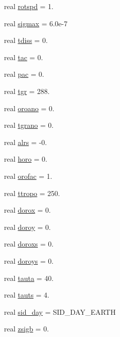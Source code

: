 \begin{DoxyCompactItemize}
\item 
real \hyperlink{classpumamod_a80df9669ec5bab4a057cae01f5c1a2e6}{rotspd} = 1.
\item 
real \hyperlink{classpumamod_abc4579c91fd4501ba251a05dd1bf516c}{sigmax} = 6.\-0e-\/7
\item 
real \hyperlink{classpumamod_a3c92fd62d271fb04326fc32013d8c199}{tdiss} = 0.
\item 
real \hyperlink{classpumamod_aa0e01ba5d349492b3449f389b5f93fed}{tac} = 0.
\item 
real \hyperlink{classpumamod_a7784d994e8d1702725dd2241891c1405}{pac} = 0.
\item 
real \hyperlink{classpumamod_a65df7e27542e483c7082758755d1f328}{tgr} = 288.
\item 
real \hyperlink{classpumamod_aa50284698e4f6c0677ad8674c812a287}{oroano} = 0.
\item 
real \hyperlink{classpumamod_aacd677d71f3a3b99afa150ea6e76ffd7}{tgrano} = 0.
\item 
real \hyperlink{classpumamod_acc7c9a43a2f8163077730a971e145878}{alrs} = -\/0.
\item 
real \hyperlink{classpumamod_aed84e71b62422066731030c119782c49}{horo} = 0.
\item 
real \hyperlink{classpumamod_abc7fb7a57043486f15c7aca03158fb2f}{orofac} = 1.
\item 
real \hyperlink{classpumamod_a5d1817a2b6703189d6ab73252b1996af}{ttropo} = 250.
\item 
real \hyperlink{classpumamod_aabd49cfc66d47dea3cf55589fc8ddabc}{dorox} = 0.
\item 
real \hyperlink{classpumamod_a2775f20201557322bc0de9c6967cc476}{doroy} = 0.
\item 
real \hyperlink{classpumamod_a848fc48f89796c7e1bfb0b1a6d2edb50}{doroxs} = 0.
\item 
real \hyperlink{classpumamod_ad8bf2c0adad70f111c86eb8924c1c52c}{doroys} = 0.
\item 
real \hyperlink{classpumamod_a2ff5f72c2ec1bb2f7a1931932165c297}{tauta} = 40.
\item 
real \hyperlink{classpumamod_a3e769cf019402107f3c6e96b8740cf35}{tauts} = 4.
\item 
real \hyperlink{classpumamod_a9c5b63f9c6cf129e3aa566b6343beb6a}{sid\-\_\-day} = \-S\-I\-D\-\_\-\-D\-A\-Y\-\_\-\-E\-A\-R\-T\-H
\item 
real \hyperlink{classpumamod_ad8b8310adc7cc23bb372abec1bb098b5}{zsigb} = 0.
\item 

\end{DoxyCompactItemize}
